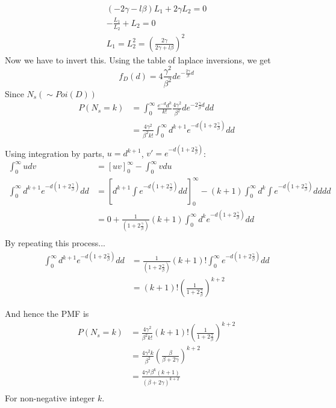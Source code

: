 \documentclass{/home/janmebows/Documents/LatexTemplates/myassignment}
\begin{document}
\begin{enumerate}
\begin{enumerate}[label=(\roman*)]
				\begin{align*}
					(-2\gamma-l\beta) L_1 + 2\gamma L_2 = 0	\\
					- \frac{L_1}{L_2} + L_2 = 0\\
					L_1 = L_2^2 = \left(\frac{2\gamma}{2\gamma + l\beta}\right)^2
				\end{align*}
				Now we have to invert this. Using the table of laplace inversions, we get 
				\[f_D(d) = 4\frac{\gamma^2}{\beta^2} d e^{-\frac{2\gamma}{\beta}d} \]
				Since $N_s(\sim Poi(D))$
				\begin{align*}
					P(N_s = k) &= \int_0^\infty \frac{e^{-d}d^k}{k!} \frac{4\gamma^2}{\beta^2} de^{-2\frac{\gamma}{\beta}d} dd\\
					&= \frac{4\gamma^2}{\beta^2k!}\int_0^\infty d^{k+1} e^{-d(1+2\frac{\gamma}{\beta})} dd\\
				\end{align*}
				Using integration by parts, $u = d^{k+1}$, $v' = e^{-d(1+2\frac{\gamma}{\beta})}$:
				\begin{align*}
					\int_0^\infty udv &= [uv]_0^\infty - \int_0^\infty vdu\\
					\int_0^\infty d^{k+1} e^{-d(1+2\frac{\gamma}{\beta})} dd&= \left[d^{k+1} \int e^{-d(1+2\frac{\gamma}{\beta})}dd\right]_0^{\infty} -(k+1)\int_0^{\infty} d^{k} \int e^{-d(1+2\frac{\gamma}{\beta})}dd dd\\
					&=  0 + \frac{1}{(1+2\frac{\gamma}{\beta})}(k+1)\int_0^{\infty} d^{k} e^{-d(1+2\frac{\gamma}{\beta})}dd\\
				\end{align*}
				By repeating this process...
				\begin{align*}
					\int_0^\infty d^{k+1} e^{-d(1+2\frac{\gamma}{\beta})} dd &= \frac{1}{(1+2\frac{\gamma}{\beta})}(k+1)! \int_0^\infty e^{-d(1+2\frac{\gamma}{\beta})}dd \\
					&= (k+1)! \left(\frac{1}{1 + 2\frac{\gamma}{\beta}}\right)^{k+2}
				\end{align*}
				
				And hence the PMF is
				\begin{align*}
					P(N_s = k) &= \frac{4\gamma^2}{\beta^2k!}(k+1)! \left(\frac{1}{1 + 2\frac{\gamma}{\beta}}\right)^{k+2}\\
					 &= \frac{4\gamma^2 k}{\beta^2} \left(\frac{\beta}{\beta+2\gamma}\right)^{k+2} \\
					 &= \frac{4\gamma^2 \beta^k (k+1)}{(\beta+2\gamma)^{k+2}} \\
				\end{align*}
				For non-negative integer $k$.


\end{enumerate}
\end{enumerate}
\end{document}
